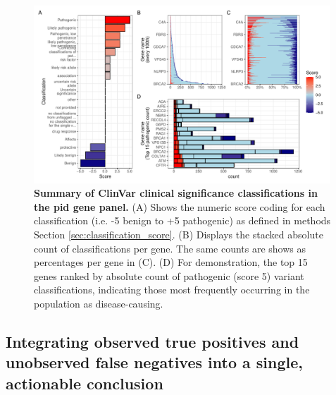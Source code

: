 \begin{figure}[ht]
  \centering
  \includegraphics[width=0.99\textwidth]{../images/p_varRisEst_summary_scores.pdf}
  \caption{\textbf{Summary of ClinVar clinical significance classifications in the \ac{pid} gene panel.} (A) Shows the numeric score coding for each classification (i.e. -5 benign to +5 pathogenic) as defined in methods Section \ref{sec:classification_score}. (B) Displays the stacked absolute count of classifications per gene. The same counts are shows as percentages per gene in (C). (D) For demonstration, the top 15 genes ranked by absolute count of pathogenic (score 5) variant classifications, indicating those most frequently occurring in the population as disease-causing.
  }
  \label{fig:p_varRisEst_summary_scores}
\end{figure} 
 
\subsection{Integrating observed true positives and unobserved false negatives into a single, actionable conclusion}
\label{sec:intregrate_tp_fn}



